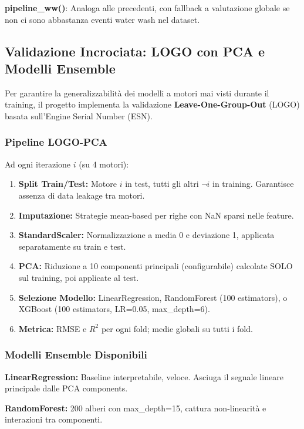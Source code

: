 \textbf{pipeline\_ww()}: Analoga alle precedenti, con fallback a valutazione globale se non ci sono abbastanza eventi water wash nel dataset.

\subsection{Validazione Incrociata: LOGO con PCA e Modelli Ensemble}

Per garantire la generalizzabilità dei modelli a motori mai visti durante il training, il progetto implementa la validazione \textbf{Leave-One-Group-Out} (LOGO) basata sull'Engine Serial Number (ESN).

\subsubsection{Pipeline LOGO-PCA}

Ad ogni iterazione $i$ (su 4 motori):
\begin{enumerate}
    \item \textbf{Split Train/Test:} Motore $i$ in test, tutti gli altri $\neg i$ in training. Garantisce assenza di data leakage tra motori.
    \item \textbf{Imputazione:} Strategie mean-based per righe con NaN sparsi nelle feature.
    \item \textbf{StandardScaler:} Normalizzazione a media 0 e deviazione 1, applicata separatamente su train e test.
    \item \textbf{PCA:} Riduzione a 10 componenti principali (configurabile) calcolate SOLO sul training, poi applicate al test.
    \item \textbf{Selezione Modello:} LinearRegression, RandomForest (100 estimators), o XGBoost (100 estimators, LR=0.05, max\_depth=6).
    \item \textbf{Metrica:} RMSE e $R^2$ per ogni fold; medie globali su tutti i fold.
\end{enumerate}

\subsubsection{Modelli Ensemble Disponibili}

\textbf{LinearRegression:} Baseline interpretabile, veloce. Asciuga il segnale lineare principale dalle PCA components.

\textbf{RandomForest:} 200 alberi con max\_depth=15, cattura non-linearità e interazioni tra componenti.

